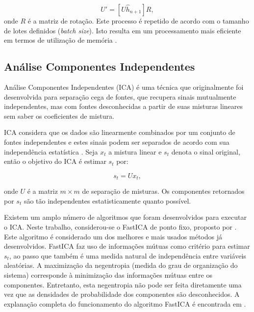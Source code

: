 \begin{equation}\label{eq:ipca1}
	U' = [U \hat{h}_{n+1}] R,
\end{equation}
\noindent onde $R$ é a matriz de rotação. Este processo é repetido de acordo com o tamanho de lotes definidos (\textit{batch size}). Isto resulta em um processamento mais eficiente em termos de utilização de memória \cite{NIPS2013_5132}.

\subsection{Análise Componentes Independentes}

Análise Componentes Independentes (ICA) \cite{lee1998independent} é uma técnica que originalmente foi desenvolvida para separação cega de fontes, que recupera sinais mutualmente independentes, mas com fontes desconhecidas a partir de suas misturas lineares sem saber os coeficientes de mistura.

ICA considera que os dados são linearmente combinados por um conjunto de fontes independentes e estes sinais podem ser separados de acordo com sua independência estatística \cite{wang2006independent}. Seja $x_t$ a mistura linear e $s_t$ denota o sinal original, então o objetivo do ICA é estimar $s_t$ por:

\begin{equation}\label{eq:ica1}
	{s_t} = {U}{x_t},
\end{equation}

\noindent onde $U$ é a matriz $m \times m$ de separação de misturas. Os componentes retornados por $s_t$ são tão independentes estatisticamente quanto possível.

Existem um amplo número de algoritmos que foram desenvolvidos para executar o ICA. Neste trabalho, considerou-se o FastICA de ponto fixo, proposto por . Este algoritmo é considerado um dos melhores e mais usados métodos já desenvolvidos. FastICA faz uso de informações mútuas como critério para estimar $s_t$, ao passo que também é uma medida natural de independência entre variáveis aleatórias. A maximização da negentropia (medida do grau de organização do sistema) corresponde à minimização das informações mútuas entre os componentes. Entretanto, esta negentropia não pode ser feita diretamente uma vez que as densidades de probabilidade dos componentes são desconhecidos. A explanação completa do funcionamento do algoritmo FastICA é encontrada em \cite{koldovsky2006efficient}.

